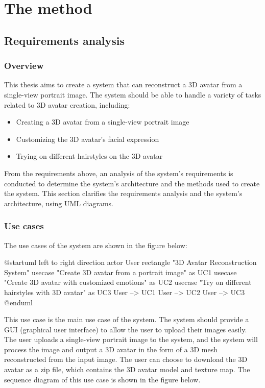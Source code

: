 \section{The method}
\label{sec:method}

\subsection{Requirements analysis}
\subsubsection{Overview}
This thesis aims to create a system that can reconstruct a 3D avatar from a single-view portrait image. The system should be able to handle a variety of tasks related to 3D avatar creation, including:
\begin{itemize}
    \item Creating a 3D avatar from a single-view portrait image

    \item Customizing the 3D avatar's facial expression

    \item Trying on different hairstyles on the 3D avatar
\end{itemize}

From the requirements above, an analysis of the system's requirements is conducted to determine the system's architecture and the methods used to create the system. This section clarifies the requirements analysis and the system's architecture, using UML diagrams.

\subsubsection{Use cases}
The use cases of the system are shown in the figure below:
\clearpage

\begin{umlfigure}
    @startuml
    left to right direction
    actor User
    rectangle "3D Avatar Reconstruction System" {
    usecase "Create 3D avatar from a portrait image" as UC1
    usecase "Create 3D avatar with customized emotions" as UC2
    usecase "Try on different hairstyles with 3D avatar" as UC3
    }
    User --> UC1
    User --> UC2
    User --> UC3
    @enduml
\end{umlfigure}

This use case is the main use case of the system. The system should provide a GUI (graphical user interface) to allow the user to upload their images easily. The user uploads a single-view portrait image to the system, and the system will process the image and output a 3D avatar in the form of a 3D mesh reconstructed from the input image. The user can choose to download the 3D avatar as a zip file, which contains the 3D avatar model and texture map. The sequence diagram of this use case is shown in the figure below.

